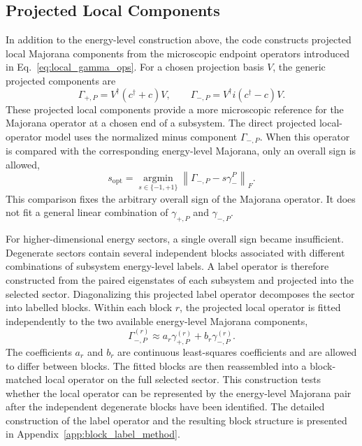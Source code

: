 \subsection{Projected Local Components}
In addition to the energy-level construction above, the code constructs projected local Majorana components from the microscopic endpoint operators introduced in Eq.~\ref{eq:local_gamma_ops}. For a chosen projection basis $V$, the generic projected components are
\begin{equation}
\Gamma_{+,P}=V^\dagger(c^\dagger+c)V,
\qquad
\Gamma_{-,P}=V^\dagger i(c^\dagger-c)V .
\end{equation}
These projected local components provide a more microscopic reference for the Majorana operator at a chosen end of a subsystem. The direct projected local-operator model uses the normalized minus component $\Gamma_{-,P}$. When this operator is compared with the corresponding energy-level Majorana, only an overall sign is allowed,
\begin{equation}
s_{\mathrm{opt}}
=
\underset{s\in\{-1,+1\}}{\operatorname{argmin}}
\left\|
\Gamma_{-,P}-s\gamma_{-}^{P}
\right\|_F .
\end{equation}
This comparison fixes the arbitrary overall sign of the Majorana operator. It does not fit a general linear combination of \(\gamma_{+,P}\) and \(\gamma_{-,P}\).

For higher-dimensional energy sectors, a single overall sign became insufficient. Degenerate sectors contain several independent blocks associated with different combinations of subsystem energy-level labels. A label operator is therefore constructed from the paired eigenstates of each subsystem and projected into the selected sector. Diagonalizing this projected label operator decomposes the sector into labelled blocks. Within each block $r$, the projected local operator is fitted independently to the two available energy-level Majorana components,
\begin{equation}
\Gamma_{-,P}^{(r)}
\approx
a_r\gamma_{+,P}^{(r)}
+
b_r\gamma_{-,P}^{(r)} .
\label{eq:method_block_matched_majorana}
\end{equation}
The coefficients $a_r$ and $b_r$ are continuous least-squares coefficients and are allowed to differ between blocks. The fitted blocks are then reassembled into a block-matched local operator on the full selected sector. This construction tests whether the local operator can be represented by the energy-level Majorana pair after the independent degenerate blocks have been identified. The detailed construction of the label operator and the resulting block structure is presented in Appendix~\ref{app:block_label_method}.

